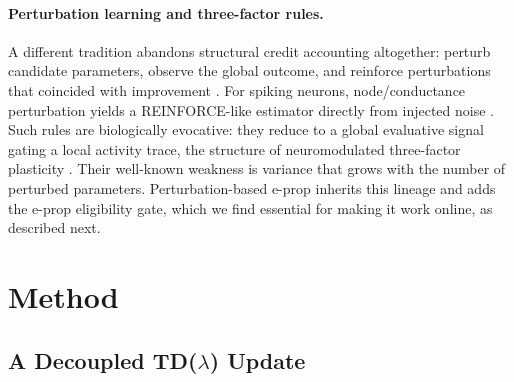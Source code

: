 \documentclass[10pt,twocolumn]{article}
\newcommand{\Method}{Perturbation-based e-prop}   %
\begin{document}
\paragraph{Perturbation learning and three-factor rules.}
A different tradition abandons structural credit accounting altogether:
perturb candidate parameters, observe the global outcome, and reinforce
perturbations that coincided with improvement
\citep{salimans2017evolutionstrategiesscalablealternative}. For spiking
neurons, node/conductance perturbation yields a REINFORCE-like estimator
directly from injected noise \citep{fiete2006gradient}. Such rules are
biologically evocative: they reduce to a global evaluative signal gating a
local activity trace, the structure of neuromodulated three-factor plasticity
\citep{Fremaux2016NeuromodulatedSTDP,Izhikevich2007DistalReward,
Florian2007RewardSTDP}. Their well-known weakness is variance that grows with
the number of perturbed parameters. \Method{} inherits this lineage
and adds the e-prop eligibility gate, which we find essential for making it
work online, as described next.

\section{Method}
\label{sec:method}

\subsection{A Decoupled TD($\lambda$) Update}
\label{sec:tdlambda}
\end{document}

